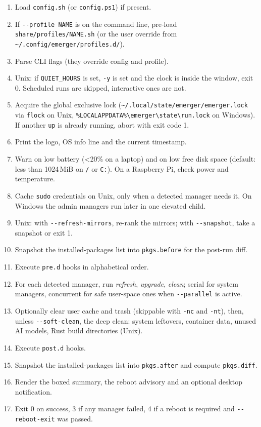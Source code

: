 \documentclass[11pt,a4paper]{article}
\begin{document}
\begin{enumerate}
  \item Load \texttt{config.sh} (or \texttt{config.ps1}) if present.
  \item If \texttt{-{}-profile NAME} is on the command line, pre-load
        \verb|share/profiles/NAME.sh| (or the user override from
        \verb|~/.config/emerger/profiles.d/|).
  \item Parse CLI flags (they override config and profile).
  \item Unix: if \texttt{QUIET\_HOURS} is set, \texttt{-y} is set and the
        clock is inside the window, exit 0. Scheduled runs are skipped,
        interactive ones are not.
  \item Acquire the global exclusive lock (\verb|~/.local/state/emerger/emerger.lock| via
        \texttt{flock} on Unix, \verb|%LOCALAPPDATA%\emerger\state\run.lock| on Windows). If another \texttt{up} is already
        running, abort with exit code 1.
  \item Print the logo, OS info line and the current timestamp.
  \item Warn on low battery (<20\% on a laptop) and on low free disk
        space (default: less than 1024\,MiB on \texttt{/} or \texttt{C:}).
        On a Raspberry Pi, check power and temperature.
  \item Cache \texttt{sudo} credentials on Unix, only when a detected
        manager needs it. On Windows the admin managers run later in one
        elevated child.
  \item Unix: with \texttt{-{}-refresh-mirrors}, re-rank the mirrors; with
        \texttt{-{}-snapshot}, take a snapshot or exit 1.
  \item Snapshot the installed-packages list into \texttt{pkgs.before} for
        the post-run diff.
  \item Execute \texttt{pre.d} hooks in alphabetical order.
  \item For each detected manager, run \textit{refresh}, \textit{upgrade},
        \textit{clean}; serial for system managers, concurrent for safe
        user-space ones when \texttt{-{}-parallel} is active.
  \item Optionally clear user cache and trash (skippable with
        \texttt{-nc} and \texttt{-nt}), then, unless
        \texttt{-{}-soft-clean}, the deep clean: system leftovers,
        container data, unused AI models, Rust build directories (Unix).
  \item Execute \texttt{post.d} hooks.
  \item Snapshot the installed-packages list into \texttt{pkgs.after} and
        compute \texttt{pkgs.diff}.
  \item Render the boxed summary, the reboot advisory and an optional
        desktop notification.
  \item Exit 0 on success, 3 if any manager failed, 4 if a reboot is
        required and \texttt{-{}-reboot-exit} was passed.
\end{enumerate}
\end{document}
